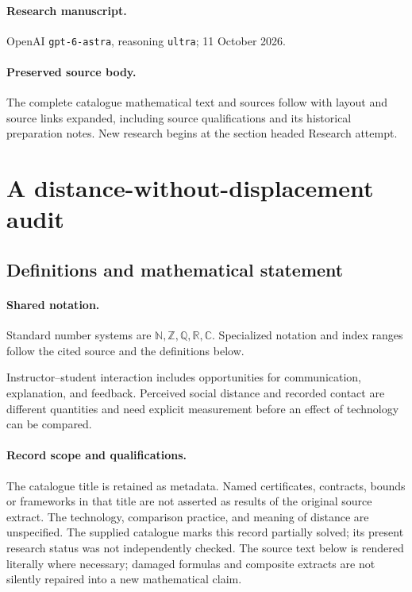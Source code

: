 \documentclass[11pt]{article}
\begin{document}
\paragraph{Research manuscript.} OpenAI \texttt{gpt-6-astra}, reasoning \texttt{ultra}; 11 October 2026.
\paragraph{Preserved source body.} The complete catalogue mathematical text and sources follow with layout and source links expanded, including source qualifications and its historical preparation notes. New research begins at the section headed Research attempt.

\section{A distance-without-displacement audit}\label{statement}

\subsection{Definitions and mathematical statement}

\paragraph{Shared notation.}Standard number systems are $\mathbb N,\mathbb Z,\mathbb Q,\mathbb R,\mathbb C$. Specialized notation and index ranges follow the cited source and the definitions below.


Instructor--student interaction includes opportunities for communication, explanation, and feedback. Perceived social distance and recorded contact are different quantities and need explicit measurement before an effect of technology can be compared.
\paragraph{Record scope and qualifications.}
The catalogue title is retained as metadata. Named certificates, contracts, bounds or frameworks in that title are not asserted as results of the original source extract.
The technology, comparison practice, and meaning of distance are unspecified. The supplied catalogue marks this record partially solved; its present research status was not independently checked.
The source text below is rendered literally where necessary; damaged formulas and composite extracts are not silently repaired into a new mathematical claim.
\end{document}
